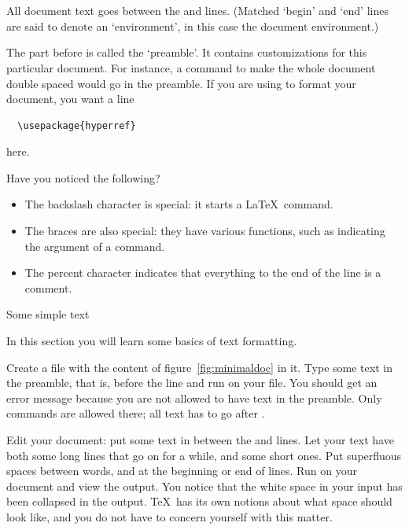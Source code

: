 All document text goes between the \verb++ and
\verb++ lines. (Matched `begin' and `end' lines are said
to denote an `environment', in this case the document environment.)

The part before \verb++ is called the `preamble'. It
contains customizations for this particular document. For instance, a
command to make the whole document double spaced would go in the
preamble. If you are using  to format your document, you
want a line
\begin{verbatim}
  \usepackage{hyperref}
\end{verbatim}
here.

Have you noticed the following?
\begin{itemize}
\item The backslash character is special: it starts a \LaTeX\ command.
\item The braces are also special: they have various functions, such
  as indicating the argument of a command.
\item The percent character indicates that everything to the end of
  the line is a comment.
\end{itemize}

 {Some simple text}

\begin{purpose}
  In this section you will learn some basics of text formatting.
\end{purpose}

\practical
{Create a file  with the content of
  figure~\ref{fig:minimaldoc} in it. Type some text in the preamble,
  that is, before the
   line and run  on your file.}
{You should get an error message because you are not allowed to have text
  in the preamble. Only commands are allowed there; all text has to go after
  .}{}

\practical
{Edit your document: put some text in between the 
 and  lines.
Let your text have both some long lines that go on for a while,
and some short ones. Put superfluous spaces between words, and at the
beginning or end of lines. Run  on your document and view
the output.}
{You notice that the white space in your input has been collapsed in the
  output. \TeX\ has its own notions about what space should look like,
  and you do not have to concern yourself with this matter.}{}

